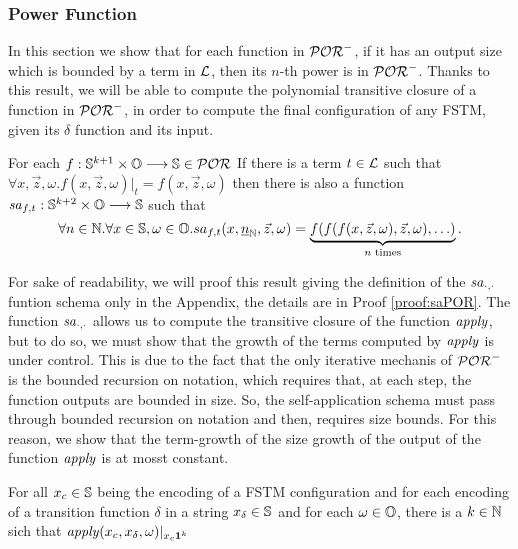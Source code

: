 \subsubsection{Power Function}
\label{subsub:pf}

In this section we show that for each function in $\mathcal{POR}^-$, if it has an output
size which is bounded by a term in $\mathcal L$, then its $n$-th power is in $\mathcal{POR}^-$.
%
Thanks to this result, we will be able to compute the polynomial transitive
closure of a function in $\mathcal{POR}^-$, in order to compute the final configuration
of any FSTM, given its $\delta$ function and its input.

\begin{lemma}
  \label{lemma:saPOR}
  For each $f : \mathbb{S}^{k+1} \times \mathbb{O} \longrightarrow \mathbb{S} \in \mathcal{POR}$
  If there is a term $t \in \mathcal L$ such that
  $\forall x, \vec z, \omega. f(x, \vec z, \omega)|_t = f(x, \vec z, \omega)$
  then there is also a function $\mathit{sa}_{f, t} : \mathbb{S}^{k+2} \times \mathbb{O} \longrightarrow \mathbb{S}$
  such that
  $$
  \forall n \in \mathbb{N}. \forall x \in \mathbb{S},  \omega \in \mathbb{O}.
  sa_{f, t}(x, {\underline {n}}_{\mathbb{N}}, \vec z, \omega) =
  \underbrace{f(f(f(x, \vec z,  \omega), \vec z, \omega), \ldots)}_{n\text{ times}}.
  $$
\end{lemma}

For sake of readability, we will proof this result giving the definition of the
$\mathit{sa}_{\cdot, \cdot}$ funtion schema only in the Appendix, the details
are in Proof \ref{proof:saPOR}.
%
The function $\mathit{sa}_{\cdot,\cdot}$ allows us to compute
the transitive closure of the function $\mathit{apply}$, but to do so,
we must show that the growth of the terms computed by $\mathit{apply}$
is under control. This is due to the fact that the only iterative
mechanis of $\mathcal{POR}^-$ is the bounded recursion on notation, which
requires that, at each step, the function outputs are bounded in size.
%
So, the self-application schema must pass through bounded recursion on notation
and then, requires size bounds. For this reason, we show that the term-growth
of the size growth of the output of the function $\mathit{apply}$ is at mosst constant.

\begin{lemma}
  \label{lemma:applysize}
  For all $x_c\in \mathbb{S}$ being the encoding of a FSTM configuration
  and for each encoding of a transition function $\delta$
  in a string $x_\delta \in \mathbb{S}$ and for each $\omega\in \mathbb{O}$, there is
  a $k \in \mathbb{N}$ sich that
  $\mathit{apply}(x_c, x_\delta, \omega)|_{x_c\mathbf{1}^k}$
\end{lemma}

